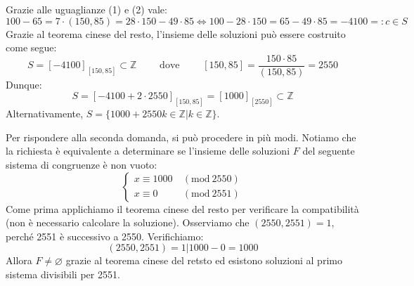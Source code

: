 \documentclass[oneside]{book}
\theoremstyle{remark}
\newcommand{\Mod}[1]{\ (\mathrm{mod}\ #1)} %
\begin{document}
\begin{tcolorbox}[colback=blue!30, colframe=blue!30!black,]
    Grazie alle uguaglianze (1) e (2) vale:
    \[ 100-65=7\cdot(150,85)=28\cdot150-49\cdot85 \Longleftrightarrow 100-28\cdot150=65-49\cdot85=-4100=:c\in S \]
    Grazie al teorema cinese del resto, l'insieme delle soluzioni può essere
    costruito come segue: \[ S=[-4100]_{[150,85]}\subset\mathbb{Z} \qquad\text{ dove }\qquad [150,85]=\frac{150\cdot85}{(150,85)}=2550\]
    Dunque:
    \[ S=[-4100+2\cdot2550]_{[150,85]}=[1000]_{[2550]}\subset\mathbb{Z} \]
    Alternativamente, $S=\{1000+2550k\in\mathbb{Z}|k\in\mathbb{Z}\}$.
    
    Per rispondere alla seconda domanda, si può procedere in più modi. Notiamo
    che la richiesta è equivalente a determinare se l'insieme delle soluzioni
    $F$ del seguente sistema di congruenze è non vuoto:
    \[
    \begin{cases}
        x\equiv 1000 &\Mod{2550}\\
        x\equiv 0    &\Mod{2551}
    \end{cases}
    \]
    Come prima applichiamo il teorema cinese del resto per verificare la
    compatibilità (non è necessario calcolare la soluzione). Osserviamo
    che $(2550,2551)=1$, perché 2551 è successivo a 2550. Verifichiamo:
    \[ (2550,2551)=1|1000-0=1000 \]
    Allora $F\not=\varnothing$ grazie al teorema cinese del
    retsto ed esistono soluzioni al primo sistema divisibili
    per 2551.
\end{tcolorbox}
\end{document}
